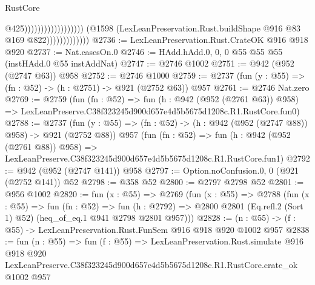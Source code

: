 \begin{lexlean}{RustCore}
\begin{coremodule}
                                                              @425))))))))))))))))))
                          (@1598
                            (LexLeanPreservation.Rust.buildShape @916 @83 @169 @822)))))))))))))
@2736 := LexLeanPreservation.Rust.CrateOK @916 @918 @920
@2737 := Nat.casesOn.{0}
@2746 := HAdd.hAdd.{0, 0, 0} @55 @55 @55 (instHAdd.{0} @55 instAddNat)
@2747 := @2746 @1002
@2751 := @942 (@952 (@2747 @63)) @958
@2752 := @2746 @1000
@2759 := @2737 (fun (y : @55) => (fn : @52) -> (h : @2751) -> @921 (@2752 @63)) @957
@2761 := @2746 Nat.zero
@2769 := @2759
    (fun (fn : @52) =>
    fun (h : @942 (@952 (@2761 @63)) @958) =>
    LexLeanPreserve.C38f323245d900d657e4d5b5675d1208c.R1.RustCore.fun0)
@2788 := @2737
    (fun (y : @55) => (fn : @52) -> (h : @942 (@952 (@2747 @88)) @958) -> @921 (@2752 @88))
    @957
    (fun (fn : @52) =>
    fun (h : @942 (@952 (@2761 @88)) @958) =>
    LexLeanPreserve.C38f323245d900d657e4d5b5675d1208c.R1.RustCore.fun1)
@2792 := @942 (@952 (@2747 @141)) @958
@2797 := Option.noConfusion.{0, 0} (@921 (@2752 @141)) @52
@2798 := @358 @52
@2800 := @2797 @2798 @52
@2801 := @956 @1002
@2820 := fun (x : @55) =>
  @2769
    (fun (x : @55) =>
    @2788
      (fun (x : @55) =>
      fun (fn : @52) =>
      fun (h : @2792) =>
      @2800 @2801 (Eq.refl.{2} (Sort 1) @52) (heq_of_eq.{1} @941 @2798 @2801 @957)))
@2828 := (n : @55) -> (f : @55) -> LexLeanPreservation.Rust.FunSem @916 @918 @920 @1002 @957
@2838 := fun (n : @55) =>
  fun (f : @55) =>
  LexLeanPreservation.Rust.simulate
    @916
    @918
    @920
    LexLeanPreserve.C38f323245d900d657e4d5b5675d1208c.R1.RustCore.crate_ok
    @1002
    @957
\end{coremodule}
\end{lexlean}
